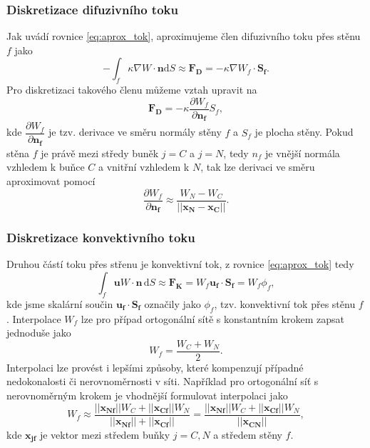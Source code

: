 \subsubsection{Diskretizace difuzivního toku}
Jak uvádí rovnice \ref{eq:aprox_tok}, aproximujeme člen difuzivního toku přes stěnu $f$ jako
\begin{equation}
-\int_f \kappa \nabla W \cdot \mathbf{n}\mathrm{d}S \approx \mathbf{F_D} = -\kappa \nabla W_f \cdot \mathbf{S_f}.
\end{equation}
Pro diskretizaci takového členu můžeme vztah upravit na
\begin{equation}
\mathbf{F_D} = -\kappa \dfrac{\partial W_f}{\partial \mathbf{n_f}} S_f,
\end{equation}
kde $\dfrac{\partial W_f}{\partial \mathbf{n_f}}$ je tzv. derivace ve směru normály stěny $f$ a $S_f$ je plocha stěny. Pokud stěna $f$ je právě mezi středy buněk $ j=C $ a $ j=N $, tedy $ n_f $ je vnější normála vzhledem k buňce $ C $ a vnitřní vzhledem k $ N $, tak lze derivaci ve směru aproximovat pomocí 
\begin{equation}
\dfrac{\partial W_f}{\partial \mathbf{n_f}} \approx \dfrac{W_N-W_C}{||\mathbf{x_N}-\mathbf{x_C}||}.
\end{equation}

\subsubsection{Diskretizace konvektivního toku}
Druhou částí toku přes střenu je konvektivní tok, z rovnice \ref{eq:aprox_tok} tedy
\begin{equation}
\int_f \mathbf{u}W\cdot \mathbf{n}\, \mathrm{d}S
\approx
\mathbf{F_K}
=
W_f \mathbf{u_f}\cdot \mathbf{S_f}=W_f\phi_f,
\end{equation}
kde jsme skalární součin $ \mathbf{u_f}\cdot \mathbf{S_f} $ označily jako $ \phi_f $, tzv. konvektivní tok přes stěnu $ f $. Interpolace $ W_f $ lze pro případ ortogonální sítě s konstantním krokem zapsat jednoduše jako
\begin{equation}
W_f = \dfrac{W_C+W_N}{2}.
\end{equation}
Interpolaci lze provést i lepšími způsoby, které kompenzují případné nedokonalosti či nerovnoměrnosti v síti. Například pro ortogonální síť s nerovnoměrným krokem je vhodnější formulovat interpolaci jako
\begin{equation}
W_f \approx \dfrac{||\mathbf{x_{Nf}}|| W_C + ||\mathbf{x_{Cf}}|| W_N }
{||\mathbf{x_{Nf}}|| + ||\mathbf{x_{Cf}}||}
= 
\dfrac{||\mathbf{x_{Nf}}|| W_C + ||\mathbf{x_{Cf}}|| W_N }
{||\mathbf{x_{CN}}||},
\end{equation}
kde $ \mathbf{x_{jf}} $ je vektor mezi středem buňky $ j=C,N $ a středem stěny $ f $.

